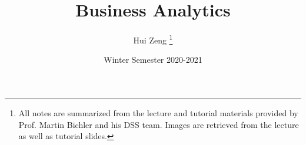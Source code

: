 \title{Business Analytics}
\author{Hui Zeng \thanks{All notes are summarized from the lecture and tutorial materials provided by Prof. Martin Bichler and his DSS team. Images are retrieved from the lecture as well as tutorial slides.}}
\date{Winter Semester 2020-2021}
\maketitle

\newpage